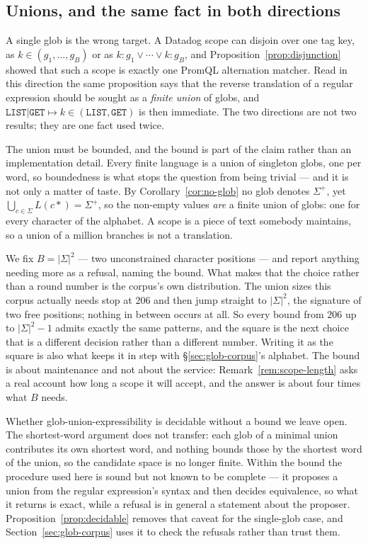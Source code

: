 \iffull\fi

\subsection{Unions, and the same fact in both directions}
\label{sec:glob-unions}

A single glob is the wrong target. A Datadog scope can disjoin over one tag key, as
$k \in (g_1,\dots,g_B)$ or as $k{:}g_1 \vee \cdots \vee k{:}g_B$, and
Proposition~\ref{prop:disjunction} showed that such a scope is exactly one PromQL
alternation matcher. Read in this direction the same proposition says that the reverse
translation of a regular expression should be sought as a \emph{finite union} of globs,
and $\mathtt{LIST|GET}\mapsto k \in (\texttt{LIST},\texttt{GET})$ is then immediate. The
two directions are not two results; they are one fact used twice.

The union must be bounded, and the bound is part of the claim rather than an
implementation detail. Every finite language is a union of singleton globs, one per word,
so boundedness is what stops the question from being trivial --- and it is not only a
matter of taste. By Corollary~\ref{cor:no-glob} no glob denotes $\Sigma^{+}$, yet
$\bigcup_{c\in\Sigma}L(c*)=\Sigma^{+}$, so the non-empty values \emph{are} a finite union
of globs: one for every character of the alphabet. A scope is a piece of text somebody
maintains, so a union of a million branches is not a translation.

We fix $B=|\Sigma|^{2}$ --- two unconstrained character positions --- and report anything
needing more as a refusal, naming the bound. What makes that the choice rather than a
round number is the corpus's own distribution. The union sizes this corpus actually needs
stop at $206$ and then jump straight to $|\Sigma|^{2}$, the signature of two free
positions; nothing in between occurs at all. So every bound from $206$ up to
$|\Sigma|^{2}-1$ admits exactly the same patterns, and the square is the next choice that
is a different decision rather than a different number. Writing it as the square is also
what keeps it in step with \S\ref{sec:glob-corpus}'s alphabet. The bound is about maintenance and not about the
service: Remark~\ref{rem:scope-length} asks a real account how long a scope it will
accept, and the answer is about four times what $B$ needs.

\iffull\fi

Whether glob-union-expressibility is decidable without a bound we leave open. The shortest-word
argument does not transfer: each glob of a minimal union contributes its own shortest
word, and nothing bounds those by the shortest word of the union, so the candidate space
is no longer finite. Within the bound the procedure used here is sound but not known to be
complete --- it proposes a union from the regular expression's syntax and then decides
equivalence, so what it returns is exact, while a refusal is in general a statement about
the proposer. Proposition~\ref{prop:decidable} removes that caveat for the single-glob
case, and Section~\ref{sec:glob-corpus} uses it to check the refusals rather than trust
them.

